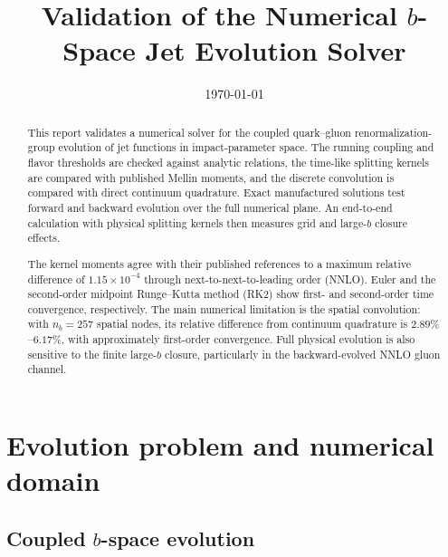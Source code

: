 \documentclass[11pt]{article}
\title{\textbf{Validation of the Numerical \(b\)-Space Jet Evolution Solver}}
\author{}
\date{\today}
\begin{document}
\maketitle

\begin{abstract}
This report validates a numerical solver for the coupled quark--gluon
renormalization-group evolution of jet functions in impact-parameter space.
The running coupling and flavor thresholds are checked against analytic
relations, the time-like splitting kernels are compared with published Mellin
moments, and the discrete convolution is compared with direct continuum
quadrature. Exact manufactured solutions test forward and backward evolution
over the full numerical plane. An end-to-end calculation with physical
splitting kernels then measures grid and large-\(b\) closure effects.

The kernel moments agree with their published references to a maximum relative
difference of \(1.15\times10^{-4}\) through next-to-next-to-leading order
(NNLO). Euler and the second-order midpoint Runge--Kutta method (RK2) show
first- and second-order time convergence, respectively. The main numerical
limitation is the spatial convolution: with \(n_b=257\) spatial nodes, its relative difference
from continuum quadrature is \(2.89\%\)--\(6.17\%\), with approximately
first-order convergence. Full physical evolution is also sensitive to the
finite large-\(b\) closure, particularly in the backward-evolved NNLO gluon
channel.
\end{abstract}

\tableofcontents

\section{Evolution problem and numerical domain}

\subsection{Coupled \texorpdfstring{\(b\)}{b}-space evolution}
\end{document}
